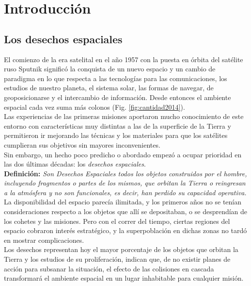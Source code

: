 \chapter{Introducción}
\label{chap:introduccion}


\section{Los desechos espaciales}

El comienzo de la era satelital en el a\~no 1957 con la puesta en \'orbita del sat\'elite ruso Sputnik signific\'o la conquista de un nuevo espacio y un cambio de paradigma en lo que respecta a las tecnolog\'ias para las comunicaciones, los estudios de nuestro planeta, el sistema solar, las formas de navegar, de geoposicionarse y el intercambio de informaci\'on. Desde entonces el ambiente espacial cada vez suma m\'as colonos (Fig. \ref{fig:cantidad2014}).\\

Las experiencias de las primeras misiones aportaron mucho conocimiento de este entorno con caracter\'isticas muy distintas a las de la superficie de la Tierra y permitieron ir mejorando las t\'ecnicas y los materiales para que los sat\'elites cumplieran sus objetivos sin mayores inconvenientes.\\
Sin embargo, un hecho poco predicho o abordado empez\'o a ocupar prioridad en las dos \'ultimas d\'ecadas: los {\it{desechos espaciales}}.\\

{\bf{Definici\'on:}}{\it{ Son Desechos Espaciales todos los objetos construidos por el hombre, incluyendo fragmentos o partes de los mismos, que orbitan la Tierra o reingresan a la atm\'osfera y no son funcionales, es decir, han perdido su capacidad operativa.}} \citep{iadcguide}\\

La disponibilidad del espacio parec\'ia ilimitada, y los primeros a\~nos no se ten\'ian consideraciones respecto a los objetos que all\'i se depositaban, o se desprend\'ian de los cohetes y las misiones. Pero con el correr del tiempo, ciertas regiones del espacio cobraron inter\' es estrat\'egico, y la superpoblaci\'on en dichas zonas no tard\'o en mostrar complicaciones.\\

Los desechos representan hoy el mayor porcentaje de los objetos que orbitan la Tierra y los estudios de su proliferaci\'on, indican que, de no existir planes de acci\'on para subsanar la situaci\'on, el efecto de las colisiones en cascada transformar\'a el ambiente espacial en un lugar inhabitable para cualquier misi\'on.\\

